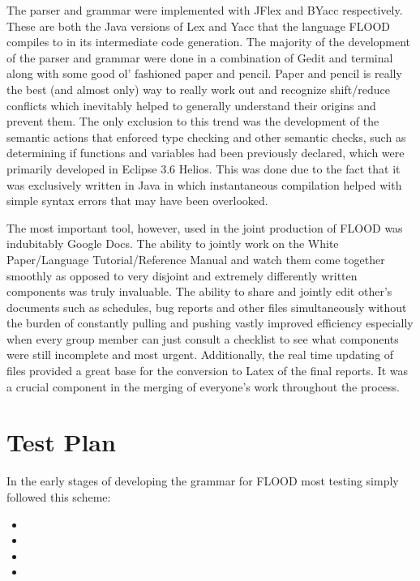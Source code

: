 \documentclass[12pt]{report}
\begin{document}
The parser and grammar were implemented with JFlex and BYacc respectively. These are both the Java versions of Lex and Yacc that the language FLOOD compiles to in its intermediate code generation. The majority of the development of the parser and grammar were done in a combination of Gedit and terminal along with some good ol’ fashioned paper and pencil. Paper and pencil is really the best (and almost only) way to really work out and recognize shift/reduce conflicts which inevitably helped to generally understand their origins and prevent them. The only exclusion to this trend was the development of the semantic actions that enforced type checking and other semantic checks, such as determining if functions and variables had been previously declared, which were primarily developed in Eclipse 3.6 Helios. This was done due to the fact that it was exclusively written in Java in which instantaneous compilation helped with simple syntax errors that may have been overlooked.

The most important tool, however, used in the joint production of FLOOD was indubitably Google Docs. The ability to jointly work on the White Paper/Language Tutorial/Reference Manual and watch them come together smoothly as opposed to very disjoint and extremely differently written components was truly invaluable. The ability to share and jointly edit other’s documents such as schedules, bug reports and other files simultaneously without the burden of constantly pulling and pushing vastly improved efficiency especially when every group member can just consult a checklist to see what components were still incomplete and most urgent. Additionally, the real time updating of files provided a great base for the conversion to Latex of the final reports. It was a crucial component in the merging of everyone’s work throughout the process.

\chapter{Test Plan}

In the early stages of developing the grammar for FLOOD most testing simply followed this scheme:

\begin{itemize}
\item 
\item 
\item 
\item 
\end{itemize}
\end{document}

